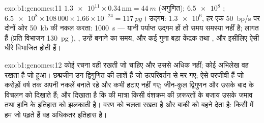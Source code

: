 \begin{solution}{exo:b1:genomes:11}
$\num{1.3e11}\times 0.34\,\mathrm{nm} = \qty{44}{m}$ (अगुणित);
$\num{6.5e8}$ ;  $\num{6.5e8}\times 108\,000\times
1.66\times 10^{-24} = \qty{117}{pg}$। उद्गम: $\num{1.3e6}$, हर एक
\qty{50}{bp/s} पर दोनों ओर \qty{50}{kb} की नकल करता: \qty{1000}{s}
--- यानी पर्याप्त उद्गम हों तो समय समस्या नहीं है; लागत
 हैं (प्रति विभाजन \qty{130}{pg} ), , उन्हें
बनाने का समय, और कई गुना बड़ा केंद्रक तथा , और इसीलिए
ऐसी  धीरे विभाजित होती हैं।
\end{solution}

\begin{solution}{exo:b1:genomes:12}
कोई रचना वही रखती जो चाहिए और उससे अधिक नहीं; कोई अभिलेख वह रखता है
जो हुआ। छद्मजीन उन द्विगुणित  की लाशें हैं जो
उत्परिवर्तन से मर गए;  ऐसे परजीवी हैं जो करोड़ों वर्ष तक
अपनी नकलें बनाते रहे और कभी हटाए नहीं गए; जीन-कुल द्विगुणन और उसके बाद के
विचलन को दिखाते हैं; और  दिखाता है कि  की मात्रा किसी
वंशक्रम की ज़रूरतों के बजाय उसके जमाव तथा हानि के इतिहास को झलकाती है।
वरण  को चलता रखता है और बाकी को बहने देता है: किसी  में हम जो
पढ़ते हैं वह अधिकतर इतिहास है।
\end{solution}

